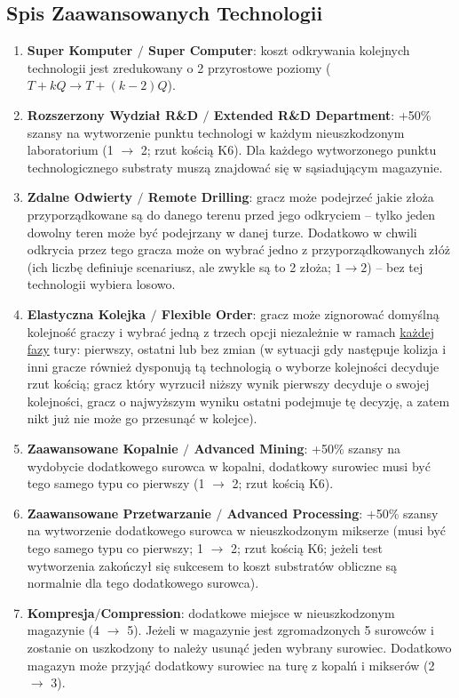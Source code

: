 \documentclass[11pt,a4paper]{article}
\begin{document}
\subsection{Spis Zaawansowanych Technologii}
\begin{enumerate}
\item \textbf{Super Komputer $/$ Super Computer}: koszt odkrywania kolejnych technologii jest zredukowany o 2 przyrostowe poziomy  ($T+kQ \to T+(k-2)Q$).
\item \textbf{Rozszerzony Wydział R\&D $/$ Extended R\&D Department}: +50\% szansy na wytworzenie punktu technologi w każdym nieuszkodzonym laboratorium (1 $\to$ 2; rzut kością K6). Dla każdego wytworzonego punktu technologicznego substraty muszą znajdować się w sąsiadującym magazynie.
\item \textbf{Zdalne Odwierty $/$ Remote Drilling}: gracz może podejrzeć jakie złoża przyporządkowane są do danego terenu przed jego odkryciem -- tylko jeden dowolny teren może być podejrzany w danej turze. Dodatkowo w chwili odkrycia przez tego gracza może on wybrać jedno z przyporządkowanych złóż (ich liczbę definiuje scenariusz, ale zwykle są to 2 złoża; $1 \to 2$) -- bez tej technologii wybiera losowo.
\item \textbf{Elastyczna Kolejka $/$ Flexible Order}: gracz może zignorować domyślną kolejność graczy i wybrać jedną z trzech opcji niezależnie w ramach \underline{każdej fazy} tury: pierwszy, ostatni lub bez zmian (w sytuacji gdy następuje kolizja i inni gracze również dysponują tą technologią o wyborze kolejności decyduje rzut kością; gracz który wyrzucił niższy wynik pierwszy decyduje o swojej kolejności, gracz o najwyższym wyniku ostatni podejmuje tę decyzję, a zatem nikt już nie może go przesunąć w kolejce).
\item \textbf{Zaawansowane Kopalnie $/$ Advanced Mining}: +50\% szansy na wydobycie dodatkowego surowca w kopalni, dodatkowy surowiec musi być tego samego typu co pierwszy (1 $\to$ 2; rzut kością K6).
\item \textbf{Zaawansowane Przetwarzanie $/$ Advanced Processing}: +50\% szansy na wytworzenie dodatkowego surowca w nieuszkodzonym mikserze (musi być tego samego typu co pierwszy; 1 $\to$ 2; rzut kością K6; jeżeli test wytworzenia zakończył się sukcesem to koszt substratów obliczne są normalnie dla tego dodatkowego surowca).
\item \textbf{Kompresja$/$Compression}: dodatkowe miejsce w nieuszkodzonym magazynie (4 $\to$ 5). Jeżeli w magazynie jest zgromadzonych 5 surowców i zostanie on uszkodzony to należy usunąć jeden wybrany surowiec. Dodatkowo magazyn może przyjąć dodatkowy surowiec na turę z kopalń i mikserów (2 $\to$ 3).

\end{enumerate}
\end{document}
